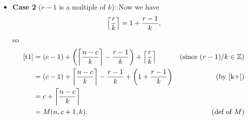 \documentclass[12pt]{article}
\newcommand{\integers}{\mathbb{Z}}
\begin{document}
\begin{enumerate}
{\begin{itemize}
\item \textbf{Case 2} ($r-1$ is a multiple of $k$): 
Now we have
\begin{equation}
\left\lceil\frac{r}{k}\right\rceil=1+\frac{r-1}{k},\label{k+}
\end{equation}
so
\begin{align*}
\text{\eqref{t1}}
  & = (c-1) + \left(\ceil{\frac{n-c}{k}} - \frac{r-1}{k}\right) +
       \ceil{\frac{r}{k}} & \text{(since $(r-1)/k \in \integers$)}\\
  & = (c-1) + \ceil{\frac{n-c}{k}} - \frac{r-1}{k} +
  \left(1+\frac{r-1}{k}\right) & \text{(by~\eqref{k+})}\\
   & = c + \ceil{\frac{n-c}{k}}\\
   & = M(n, c+1, k). & \text{(def of $M$)}
\end{align*}
\end{itemize}
}
\end{enumerate}

\end{document}
